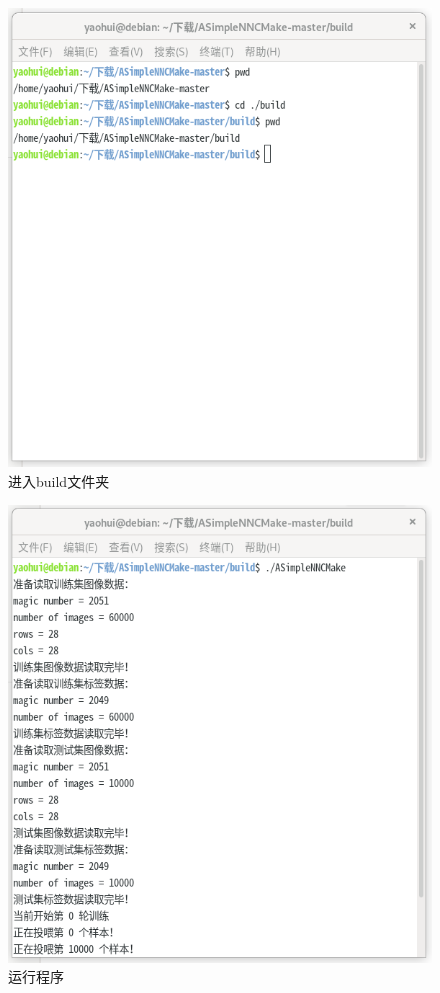 \documentclass[titlepage,UTF8,zihao=-4]{ctexart}
\begin{document}
\begin{figure}[H] 
    \centering   
    \includegraphics[width=16 cm]{./Images/step1.png}
    \caption{进入build文件夹}\label{step1}
\end{figure}

\begin{figure}[H] 
    \centering   
    \includegraphics[width=16 cm]{./Images/step2.png}
    \caption{运行程序}\label{step2}
\end{figure}
\end{document}
